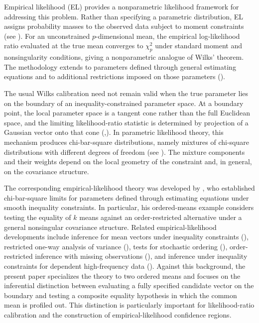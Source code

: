 \documentclass[11pt]{article}
\theoremstyle{remark}
\begin{document}
Empirical likelihood (EL) provides a nonparametric likelihood framework for addressing this problem. Rather than specifying a parametric distribution, EL assigns probability masses to the observed data subject to moment constraints (see \citet{owen1988empirical,owen1990,owen2001}). For an unconstrained $p$-dimensional mean, the empirical log-likelihood ratio evaluated at the true mean converges to $\chi^2_p$ under standard moment and nonsingularity conditions, giving a nonparametric analogue of Wilks' theorem. The methodology extends to parameters defined through general estimating equations and to additional restrictions imposed on those parameters (\citet{qinlawless1994,qin1995estimating}).

The usual Wilks calibration need not remain valid when the true parameter lies on the boundary of an inequality-constrained parameter space. At a boundary point, the local parameter space is a tangent cone rather than the full Euclidean space, and the limiting likelihood-ratio statistic is determined by projection of a Gaussian vector onto that cone (\citet{chernoff1954distribution},\citet{geyer1994asymptotics}). In parametric likelihood theory, this mechanism produces chi-bar-square distributions, namely mixtures of chi-square distributions with different degrees of freedom (see \citet{shapiro1985,selfliang1987,silvapulle2005}). The mixture components and their weights depend on the local geometry of the constraint and, in general, on the covariance structure.

The corresponding empirical-likelihood theory was developed by \citet{el1996empirical}, who established chi-bar-square limits for parameters defined through estimating equations under smooth inequality constraints. In particular, his ordered-means example considers testing the equality of $k$ means against an order-restricted alternative under a general nonsingular covariance structure. Related empirical-likelihood developments include inference for mean vectors under inequality constraints (\citet{chen2011empirical}), restricted one-way analysis of variance (\citet{wen2011restricted}), tests for stochastic ordering (\citet{elbarmi2012stochastic}), order-restricted inference with missing observations (\citet{wang2017order}), and inference under inequality constraints for dependent high-frequency data (\citet{liao2026empirical}). Against this background, the present paper specializes the theory to two ordered means and focuses on the inferential distinction between evaluating a fully specified candidate vector on the boundary and testing a composite equality hypothesis in which the common mean is profiled out. This distinction is particularly important for likelihood-ratio calibration and the construction of empirical-likelihood confidence regions.
\end{document}
